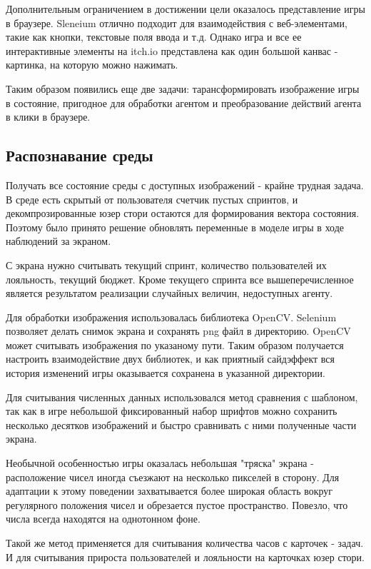\documentclass{article}
\begin{document}
Дополнительным ограничением в достижении цели оказалось представление игры в браузере.
Sleneium отлично подходит для взаимодействия с веб-элементами, такие как кнопки, текстовые поля ввода и т.д.
Однако игра и все ее интерактивные элементы на itch.io представлена как один большой канвас - картинка, на которую можно нажимать.

Таким образом появились еще две задачи: тарансформировать изображение игры в состояние, пригодное для обработки агентом и преобразование действий агента в клики в браузере.

\subsection{Распознавание среды}

Получать все состояние среды с доступных изображений - крайне трудная задача.
В среде есть скрытый от пользователя счетчик пустых спринтов, и декомпрозированные юзер стори остаются для формирования вектора состояния.
Поэтому было принято решение обновлять переменные в моделе игры в ходе наблюдений за экраном.

С экрана нужно считывать текущий спринт, количество пользователей их лояльность, текущий бюджет.
Кроме текущего спринта все вышеперечисленное является результатом реализации случайных величин, недоступных агенту.

Для обработки изображения использовалась библиотека OpenCV.
Selenium позволяет делать снимок экрана и сохранять png файл в директорию.
OpenCV может считывать изображения по указаному пути.
Таким образом получается настроить взаимодействие двух библиотек, и как приятный сайдэффект вся история изменений игры оказывается сохранена в указанной директории.

Для считывания численных данных использовался метод сравнения с шаблоном, так как в игре небольшой фиксированный набор шрифтов можно сохранить несколько десятков изображений и быстро сравнивать с ними полученные части экрана.

Необычной особенностью игры оказалась небольшая "тряска" экрана - расположение чисел иногда съезжают на несколько пикселей в сторону.
Для адаптации к этому поведении захватывается более широкая область вокруг регулярного положения чисел и обрезается пустое пространство. Повезло, что числа всегда находятся на однотонном фоне.

Такой же метод применяется для считывания количества часов с карточек - задач.
И для считывания прироста пользователей и лояльности на карточках юзер стори.
\end{document}
